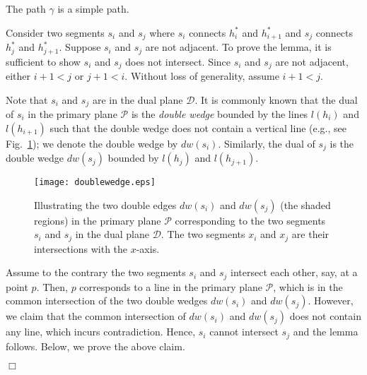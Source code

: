 \documentclass{llncs}
\newenvironment{myproof}{\noindent {\textbf{Proof:}}\rm}{\hfill $\Box$\rm}
\def\calP{\mathcal{P}}
\def\calD{\mathcal{D}}
\begin{document}
\begin{lemma}\label{lem:simple}
The path $\gamma$ is a simple path.
\end{lemma}
\begin{myproof}
Consider two segments $s_i$ and $s_j$ where $s_i$ connects $h^*_i$
and $h^*_{i+1}$ and $s_j$ connects $h^*_j$ and $h^*_{j+1}$. Suppose
$s_i$ and $s_j$ are not adjacent. To prove the lemma, it is sufficient
to show $s_i$ and $s_j$ does not intersect.
Since $s_i$ and $s_j$ are not adjacent, either $i+1<j$ or $j+1<i$.
Without loss of generality, assume $i+1<j$.


Note that $s_i$ and $s_j$ are in the dual plane $\calD$.
It is commonly known \cite{ref:deBergCo08} that
the dual of $s_i$ in the primary plane $\calP$ is the {\em double
wedge} bounded by the lines $l(h_i)$ and $l(h_{i+1})$ such that
the double wedge does not contain a vertical line
(e.g., see Fig.~\ref{fig:doublewedge}); we denote the double wedge by $dw(s_i)$.
Similarly, the dual of $s_j$ is the double wedge $dw(s_j)$ bounded by
$l(h_j)$ and $l(h_{j+1})$.

\begin{figure}[t]
\begin{minipage}[t]{\linewidth}
\begin{center}
\texttt{[image: doublewedge.eps]}
\caption{\footnotesize Illustrating the two double edges $dw(s_i)$ and
$dw(s_j)$ (the shaded
regions) in the primary plane $\calP$ corresponding to the two segments
$s_i$ and $s_j$ in the dual plane $\calD$. The two segments $x_i$ and
$x_j$ are their intersections with the $x$-axis.}\label{fig:doublewedge}
\end{center}
\end{minipage}
\vspace*{-0.15in}
\end{figure}


Assume to the contrary the two segments $s_i$ and $s_j$ intersect each
other, say, at a point $p$.
Then, $p$ corresponds to a line in the primary
plane $\calP$, which
is in the common intersection of the two double wedges $dw(s_i)$
and $dw(s_j)$. However, we claim that the
common intersection of $dw(s_i)$ and $dw(s_j)$ does not contain any
line, which incurs contradiction. Hence, $s_i$ cannot intersect $s_j$
and the lemma follows. Below, we prove the above claim.


\end{myproof}
\end{document}
